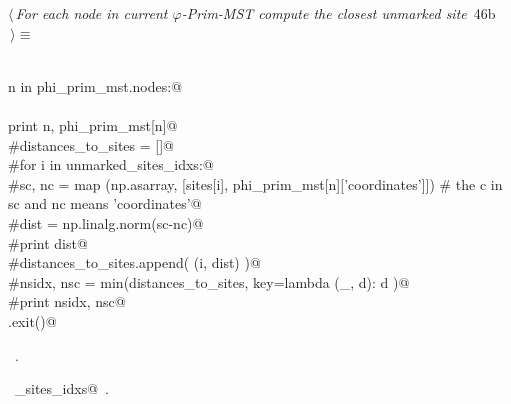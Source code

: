 \documentclass[11.5pt]{report}
\begin{document}
\begin{flushleft} \small
\begin{minipage}{\linewidth}\label{scrap55}\raggedright\small
{} $\langle\,${\itshape For each node in current $\varphi$-Prim-MST compute the closest unmarked site}\nobreak\ {\footnotesize {46b}}$\,\rangle\equiv$
\vspace{-1ex}
\begin{list}{}{} \item
\mbox{}\verb@@\\
\mbox{}\verb@for n in phi_prim_mst.nodes:@\\
\mbox{}\verb@@\\
\mbox{}\verb@     print n, phi_prim_mst[n]@\\
\mbox{}\verb@     #distances_to_sites = []@\\
\mbox{}\verb@     #for i in unmarked_sites_idxs:@\\
\mbox{}\verb@          #sc, nc = map (np.asarray, [sites[i], phi_prim_mst[n]['coordinates']]) # the c in sc and nc means 'coordinates'@\\
\mbox{}\verb@          #dist =  np.linalg.norm(sc-nc)@\\
\mbox{}\verb@          #print dist@\\
\mbox{}\verb@          #distances_to_sites.append( (i, dist) )@\\
\mbox{}\verb@     #nsidx, nsc = min(distances_to_sites, key=lambda (_, d): d )@\\
\mbox{}\verb@     #print nsidx, nsc@\\
\mbox{}\verb@sys.exit()@\\
\mbox{}\verb@@{\NWsep}
\end{list}
\vspace{-1.5ex}
\footnotesize
\begin{list}{}{\setlength{\itemsep}{-\parsep}\setlength{\itemindent}{-\leftmargin}}
\item \NWtxtMacroRefIn\ .
\item \NWtxtIdentsUsed\nobreak\  \verb@unmarked_sites_idxs@\nobreak\ .
\item{}
\end{list}
\end{minipage}\vspace{4ex}
\end{flushleft}
\vspace{-0.8cm}\newchunk
\end{document}

